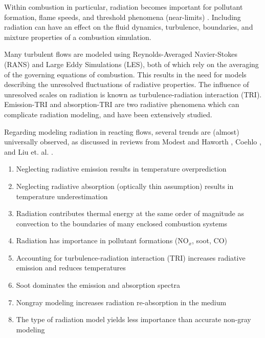 Within combustion in particular, radiation becomes important for pollutant formation, flame speeds, and threshold phenomena (near-limits) \cite{Modest2016RadiativeSystems,Coelho2018RadiativeSystems,Liu2020TheFlames}. Including radiation can have an effect on the fluid dynamics, turbulence, boundaries, and mixture properties of a combustion simulation.

Many turbulent flows are modeled using Reynolds-Averaged Navier-Stokes (RANS) and Large Eddy Simulations (LES), both of which rely on the averaging of the governing equations of combustion. This results in the need for models describing the unresolved fluctuations of radiative properties. The influence of unresolved scales on radiation is known as turbulence-radiation interaction (TRI). Emission-TRI and absorption-TRI are two radiative phenomena which can complicate radiation modeling, and have been extensively studied.

Regarding modeling radiation in reacting flows, several trends are (almost) universally observed, as discussed in reviews from Modest and Haworth \cite{Modest2016RadiativeSystems}, Coehlo \cite{Coelho2018RadiativeSystems}, and Liu et. al. \cite{Liu2020TheFlames}.

\begin{enumerate}
    \item Neglecting radiative emission results in temperature overprediction \cite{Gamil2020AssessmentChamber}
    \item Neglecting radiative absorption (optically thin assumption) results in temperature underestimation
    \item Radiation contributes thermal energy at the same order of magnitude as convection to the boundaries of many enclosed combustion systems \cite{Gamil2020AssessmentChamber,Johnson2021AnalysisMethod}
    \item Radiation has importance in pollutant formations (NO${}_x$, soot, CO) \cite{Ihme2008ModelingFormulation,Habibi2007TurbulenceFlames}
    \item Accounting for turbulence-radiation interaction (TRI) increases radiative emission and reduces temperatures
    \item Soot dominates the emission and absorption spectra
    \item Nongray modeling increases radiation re-absorption in the medium\cite{Wu2021LimitationsFires}
    \item The type of radiation model yields less importance than accurate non-gray modeling
\end{enumerate}

